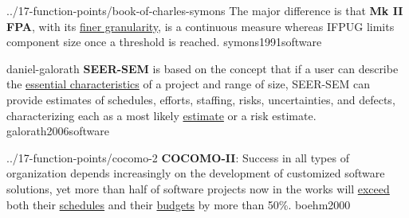\documentclass{article}
\begin{document}
\lnQuote
  {../17-function-points/book-of-charles-symons}
  {The major difference is that \textbf{Mk II FPA}, with its \ul{finer granularity}, is a continuous measure whereas IFPUG limits component size once a threshold is reached.}
  {symons1991software}


\lnQuote
  {daniel-galorath}
  {\textbf{SEER-SEM} is based on the concept that if a user can describe the \ul{essential characteristics} of a project and range of size, SEER-SEM can provide estimates of schedules, efforts, staffing, risks, uncertainties, and defects, characterizing each as a most likely \ul{estimate} or a risk estimate.}
  {galorath2006software}


\lnQuote
  {../17-function-points/cocomo-2}
  {\textbf{COCOMO-II}: Success in all types of organization depends increasingly on the development of customized software solutions, yet more than half of software projects now in the works will \ul{exceed} both their \ul{schedules} and their \ul{budgets} by more than 50\%.}
  {boehm2000}
\end{document}
